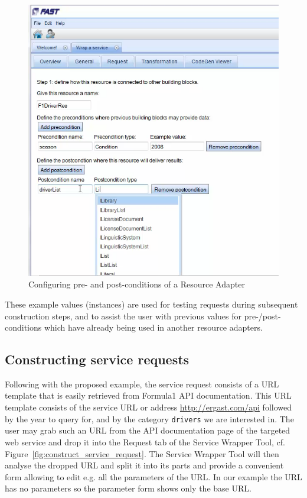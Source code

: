 \documentclass{fast_latex}
\begin{document}
\begin{figure}
  \begin{center} \includegraphics[width=\linewidth]{images/ServiceWrapperToolGVSWithPrePostConds.png}
    \caption{Configuring pre- and post-conditions of a Resource Adapter}
    \label{fig:construct_pre_post_conditions}
  \end{center}
\end{figure}

These example values (instances) are used for testing requests during subsequent construction steps, and to assist the user with previous values for pre-/post-conditions which have already being used in another resource adapters.


\subsection{Constructing service requests} %
\label{sub:constructing_service_requests}

Following with the proposed example, the service request consists of a URL template that is easily retrieved from Formula1 API documentation. This URL template consists of the service URL or address \url{http://ergast.com/api} followed by the year to query for, and by the category \verb|drivers| we are interested in. The user may grab such an URL from the API documentation page of the targeted web service and drop it into the Request tab of the Service Wrapper Tool, cf. Figure~\ref{fig:construct_service_request}. The Service Wrapper Tool will then analyse the dropped URL and split it into its parts and provide a convenient form allowing to edit e.g. all the parameters of the URL. In our example the URL has no parameters so the parameter form shows only the base URL. 
\end{document}
